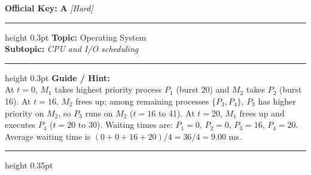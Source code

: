 \documentclass[a4paper,10pt]{article}
\begin{document}
\begin{tcolorbox}
\tcblower

\textbf{Official Key:} \textbf{\large A} \hfill \textit{\small [Hard]}
\vspace{2pt}\hrule height 0.3pt\vspace{3pt}
\textbf{Topic:} Operating System \\
\textbf{Subtopic:} \textit{CPU and I/O scheduling}
\vspace{2pt}\hrule height 0.3pt\vspace{3pt}
\textbf{Guide / Hint:} \\
{\small At $t = 0$, $M_1$ takes highest priority process $P_1$ (burst 20) and $M_2$ takes $P_2$ (burst 16). At $t = 16$, $M_2$ frees up; among remaining processes $\{P_3, P_4\}$, $P_3$ has higher priority on $M_2$, so $P_3$ runs on $M_2$ ($t = 16$ to 41). At $t = 20$, $M_1$ frees up and executes $P_4$ ($t = 20$ to 30). Waiting times are: $P_1 = 0$, $P_2 = 0$, $P_3 = 16$, $P_4 = 20$. Average waiting time is $(0 + 0 + 16 + 20) / 4 = 36 / 4 = 9.00$ ms.}

\end{tcolorbox}
\vspace{6pt}\hrule height 0.35pt\vspace{6pt}
\noindent
\end{document}
